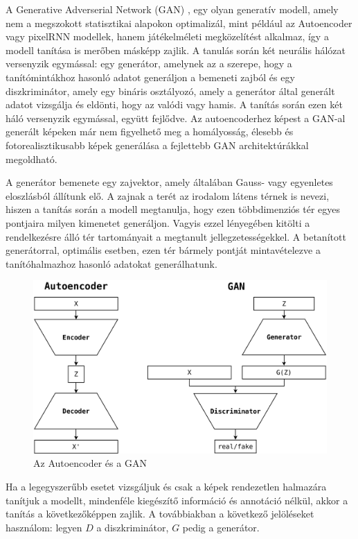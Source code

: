 A Generative Adverserial Network (GAN) \cite{goodfellow2014generative}, egy olyan generatív modell, amely nem a megszokott statisztikai alapokon optimalizál, mint például az Autoencoder vagy pixelRNN modellek, hanem játékelméleti megközelítést alkalmaz, így a modell tanítása is merőben másképp zajlik.
A tanulás során két neurális hálózat versenyzik egymással: egy generátor, amelynek az a szerepe, hogy a tanítómintákhoz hasonló adatot generáljon a bemeneti zajból és egy diszkriminátor, amely egy bináris osztályozó, amely a generátor által generált adatot vizsgálja és eldönti, hogy az valódi vagy hamis.
A tanítás során ezen két háló versenyzik egymással, együtt fejlődve. Az autoencoderhez képest a GAN-al generált képeken már nem figyelhető meg a homályosság, élesebb és fotorealisztikusabb képek generálása a fejlettebb GAN architektúrákkal megoldható.

A generátor bemenete egy zajvektor, amely általában Gauss- vagy egyenletes eloszlásból állítunk elő. A zajnak a terét az irodalom látens térnek is nevezi, hiszen a tanítás során a modell megtanulja, hogy ezen többdimenziós tér egyes pontjaira milyen kimenetet generáljon. Vagyis ezzel lényegében kitölti a rendelkezésre álló tér tartományait a megtanult jellegzetességekkel. A betanított generátorral, optimális esetben, ezen tér bármely pontját mintavételezve a tanítóhalmazhoz hasonló adatokat generálhatunk.

\begin{figure}[h]
\centering
\includegraphics[width=12cm]{images/AEvsGAN.png}
\caption{Az Autoencoder és a GAN}
\label{fig:aevsgan}
\end{figure}


Ha a legegyszerűbb esetet vizsgáljuk és csak a képek rendezetlen halmazára tanítjuk a modellt, mindenféle kiegészítő információ és annotáció nélkül, akkor a tanítás a következőképpen zajlik.
A továbbiakban a következő jelöléseket használom: legyen $D$ a diszkriminátor, $G$ pedig a generátor.

